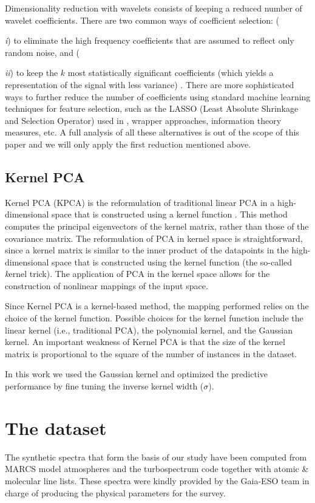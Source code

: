 \documentclass[a4paper,fleqn,usenatbib]{mnras}
\begin{document}
{Dimensionality reduction with wavelets consists of keeping a reduced
number of wavelet coefficients. There are two common ways of
coefficient selection: ({\textit i) to eliminate the high frequency
  coefficients that are assumed to reflect only random noise, and
  ({\textit {ii}) to keep the $k$ most statistically significant
    coefficients (which yields a representation of the signal with
    less variance) \citep{li:10}. There are more sophisticated ways to
    further reduce the number of coefficients using standard machine
    learning techniques for feature selection, such as the LASSO
    (Least Absolute Shrinkage and Selection Operator) used in
    \cite{2015MNRAS.452.1394L}, wrapper approaches, information theory
    measures, etc. A full analysis of all these alternatives is out of
    the scope of this paper and we will only apply the first reduction
    mentioned above.

\subsection{Kernel PCA}

Kernel PCA (KPCA) is the reformulation of traditional linear PCA in a
high-dimensional space that is constructed using a kernel function
\citep{sholkopf:98}. This method computes the principal eigenvectors
of the kernel matrix, rather than those of the covariance matrix. The
reformulation of PCA in kernel space is straightforward, since a
kernel matrix is similar to the inner product of the datapoints in the
high-dimensional space that is constructed using the kernel function
(the so-called {\textit kernel trick}). The application of PCA in the
kernel space allows for the construction of nonlinear mappings of the
input space.

Since Kernel PCA is a kernel-based method, the mapping performed
relies on the choice of the kernel function. Possible choices for the
kernel function include the linear kernel (i.e., traditional PCA), the
polynomial kernel, and the Gaussian kernel. An important weakness of
Kernel PCA is that the size of the kernel matrix is proportional to
the square of the number of instances in the dataset.

In this work we used the Gaussian kernel and optimized the predictive
performance by fine tuning the inverse kernel width ($\sigma$).
 
\section{The dataset}
\label{sec:dataset}
The synthetic spectra that form the basis of our study have been
computed from MARCS model atmospheres \citep{gustafsson:08} and the
turbospectrum code \citep{alvarez:98, plez:12} together with atomic \&
molecular line lists. These spectra were kindly provided by the
Gaia-ESO team in charge of producing the physical parameters for the
survey.

}}}
\end{document}
